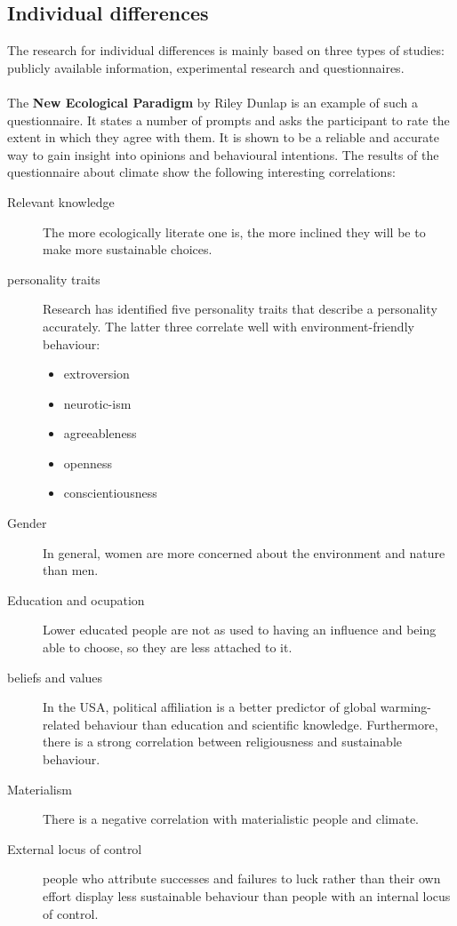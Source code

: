 \documentclass[../summary.tex]{subfiles}
\begin{document}
		\subsection{Individual differences}
			The research for individual differences is mainly based on three types of studies: publicly  available information, experimental research and questionnaires. \\
			\\
			The \textbf{New Ecological Paradigm}  by Riley Dunlap is an example of such a questionnaire. It states a number of prompts and asks the participant to rate the extent in which they agree with them. It is shown to be a reliable and accurate  way to gain insight into opinions and behavioural intentions. The results of the questionnaire about climate show the following interesting correlations:
			\begin{description}
				\item[Relevant knowledge] The more ecologically literate one is, the more inclined they will be to make more sustainable choices. 
				\item[personality traits] Research has identified five personality traits that describe a personality accurately. The latter three correlate well with environment-friendly behaviour:
				\begin{itemize}
					\item extroversion 
					\item neurotic-ism
					\item agreeableness
					\item openness
					\item conscientiousness				
				\end{itemize}
				\item[Gender] In general, women are more concerned about the environment and nature than men. 
				\item[Education and ocupation] Lower educated people are not as used to having an influence and being able to choose, so they are less attached to it. 
				\item[beliefs and values] In the USA, political affiliation is a better predictor of global warming-related behaviour than education and scientific knowledge. Furthermore, there is a strong correlation between religiousness and sustainable behaviour. 
				\item[Materialism] There is a negative correlation with materialistic people and climate.
				\item[External locus of control] people who attribute successes and failures to luck rather than their own effort display less sustainable behaviour than people with an internal locus of control.
			\end{description}
			
\end{document}
